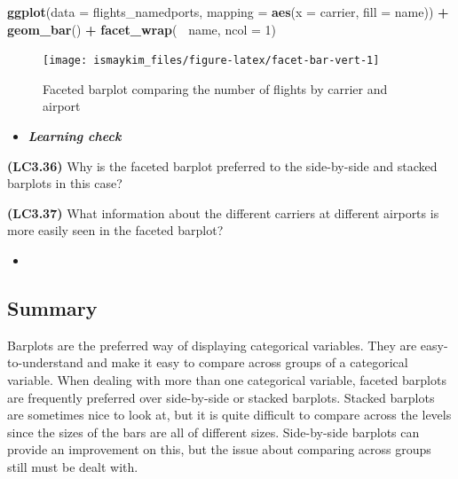 \documentclass[12pt,]{krantz}
\makeatletter
\newenvironment{Shaded}{\begin{snugshade}}{\end{snugshade}}
\newcommand{\KeywordTok}[1]{\textcolor[rgb]{0.27,0.27,0.27}{\textbf{#1}}}
\newcommand{\DataTypeTok}[1]{\textcolor[rgb]{0.27,0.27,0.27}{#1}}
\newcommand{\DecValTok}[1]{\textcolor[rgb]{0.06,0.06,0.06}{#1}}
\newcommand{\StringTok}[1]{\textcolor[rgb]{0.5,0.5,0.5}{#1}}
\newcommand{\OperatorTok}[1]{\textcolor[rgb]{0.43,0.43,0.43}{\textbf{#1}}}
\newcommand{\NormalTok}[1]{#1}
\newenvironment{kframe}{%
\medskip{}
\setlength{\fboxsep}{.8em}
 \def\at@end@of@kframe{}%
 \ifinner\ifhmode%
  \def\at@end@of@kframe{\end{minipage}}%
  \begin{minipage}{\columnwidth}%
 \fi\fi%
 \def\FrameCommand##1{\hskip\@totalleftmargin \hskip-\fboxsep
 \colorbox{shadecolor}{##1}\hskip-\fboxsep
     \hskip-\linewidth \hskip-\@totalleftmargin \hskip\columnwidth}%
 \MakeFramed {\advance\hsize-\width
   \@totalleftmargin\z@ \linewidth\hsize
   \@setminipage}}%
 {\par\unskip\endMakeFramed%
 \at@end@of@kframe}
\renewenvironment{Shaded}{\begin{kframe}}{\end{kframe}}
\newenvironment{rmdblock}[1]
  {\begin{shaded*}
  \begin{itemize}
  \renewcommand{\labelitemi}{
    \raisebox{-.7\height}[0pt][0pt]{
    }
  }
  \item
  }
  {
  \end{itemize}
  \end{shaded*}
  }
\newenvironment{learncheck}
  {\begin{rmdblock}{warning}}
  {\end{rmdblock}}
\theoremstyle{definition}
\theoremstyle{definition}
\theoremstyle{definition}
\theoremstyle{remark}
\makeatother
\begin{document}
\begin{Shaded}
\begin{Highlighting}[]
\KeywordTok{ggplot}\NormalTok{(}\DataTypeTok{data =}\NormalTok{ flights_namedports, }
       \DataTypeTok{mapping =} \KeywordTok{aes}\NormalTok{(}\DataTypeTok{x =}\NormalTok{ carrier, }\DataTypeTok{fill =}\NormalTok{ name)) }\OperatorTok{+}
\StringTok{  }\KeywordTok{geom_bar}\NormalTok{() }\OperatorTok{+}
\StringTok{  }\KeywordTok{facet_wrap}\NormalTok{(}\OperatorTok{~}\StringTok{ }\NormalTok{name, }\DataTypeTok{ncol =} \DecValTok{1}\NormalTok{)}
\end{Highlighting}
\end{Shaded}

\begin{figure}

{\centering \texttt{[image: ismaykim\_files/figure-latex/facet-bar-vert-1]} 

}

\caption{Faceted barplot comparing the number of flights by carrier and airport}\label{fig:facet-bar-vert}
\end{figure}

\begin{learncheck}
\textbf{\emph{Learning check}}
\end{learncheck}

\textbf{(LC3.36)} Why is the faceted barplot preferred to the
side-by-side and stacked barplots in this case?

\textbf{(LC3.37)} What information about the different carriers at
different airports is more easily seen in the faceted barplot?

\begin{learncheck}

\end{learncheck}

\subsection{Summary}\label{summary-4}

Barplots are the preferred way of displaying categorical variables. They
are easy-to-understand and make it easy to compare across groups of a
categorical variable. When dealing with more than one categorical
variable, faceted barplots are frequently preferred over side-by-side or
stacked barplots. Stacked barplots are sometimes nice to look at, but it
is quite difficult to compare across the levels since the sizes of the
bars are all of different sizes. Side-by-side barplots can provide an
improvement on this, but the issue about comparing across groups still
must be dealt with.
\end{document}
